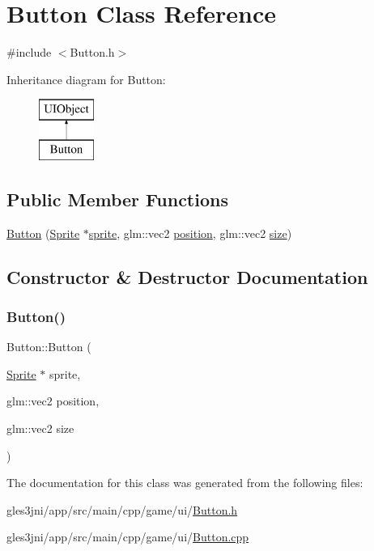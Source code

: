 \hypertarget{class_button}{}\section{Button Class Reference}
\label{class_button}


{\ttfamily \#include $<$Button.\+h$>$}

Inheritance diagram for Button\+:\begin{figure}[H]
\begin{center}
\leavevmode
\includegraphics[height=2.000000cm]{d4/d77/class_button}
\end{center}
\end{figure}
\subsection*{Public Member Functions}
\begin{DoxyCompactItemize}
\item 
\hyperlink{class_button_ac3834acc1255e4c5b3654eb5e461f378}{Button} (\hyperlink{class_sprite}{Sprite} $\ast$\hyperlink{class_u_i_object_a20929a89f31c811f44de45e2116bfed3}{sprite}, glm\+::vec2 \hyperlink{class_u_i_object_a6a16576616e633af2f212624ecc6cb45}{position}, glm\+::vec2 \hyperlink{class_u_i_object_a8aff4ab7d58367300405639712ade234}{size})
\end{DoxyCompactItemize}


\subsection{Constructor \& Destructor Documentation}
\mbox{\label{class_button_ac3834acc1255e4c5b3654eb5e461f378}} 
\subsubsection{\texorpdfstring{Button()}{Button()}}
{\footnotesize\ttfamily Button\+::\+Button (\begin{DoxyParamCaption}\item[{\hyperlink{class_sprite}{Sprite} $\ast$}]{sprite,  }\item[{glm\+::vec2}]{position,  }\item[{glm\+::vec2}]{size }\end{DoxyParamCaption})}



The documentation for this class was generated from the following files\+:\begin{DoxyCompactItemize}
\item 
gles3jni/app/src/main/cpp/game/ui/\hyperlink{_button_8h}{Button.\+h}\item 
gles3jni/app/src/main/cpp/game/ui/\hyperlink{_button_8cpp}{Button.\+cpp}\end{DoxyCompactItemize}
